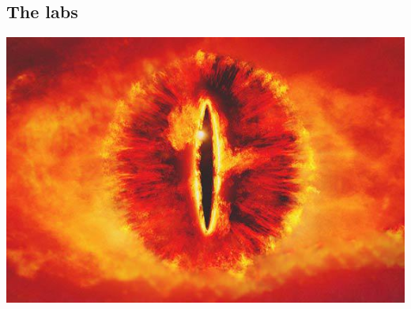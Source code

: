 \subsection{The labs}

\begin{frame}
  \includegraphics[width=\columnwidth]{figs/sauron.jpg}
\end{frame}



\begin{frame}[allowframebreaks]
  \printbibliography{}
\end{frame}
